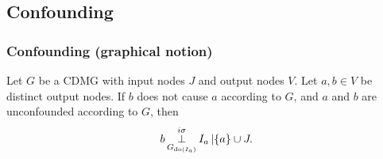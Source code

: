 
\subsection{Confounding}

\subsubsection{Confounding (graphical notion)}

\begin{Prp}\label{prp:graph_unconfounded1}
  Let $G$ be a CDMG with input nodes $J$ and output nodes $V$.
  Let $a,b \in V$ be distinct output nodes.
  If $b$ does not cause $a$ according to $G$, and $a$ and $b$ are unconfounded according to $G$, then
  $$b \operatorname*{\perp}^{i\sigma}_{G_{\operatorname{do}(I_a)}} I_a \operatorname*{|} \{a\} \cup J.$$
\end{Prp}
